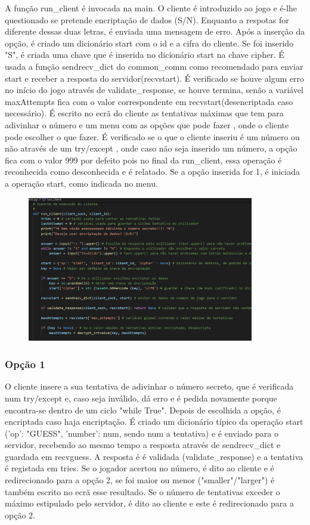 \documentclass{report}
\begin{document}
\label{ssec:runclient}
A função run\_client é invocada na main. O cliente é introduzido ao jogo e é-lhe questionado se pretende encriptação
de dados (S/N). Enquanto a respotas for diferente dessas duas letras, é enviada uma mensagem de erro. Após a inserção da
opção, é criado um dicionário start com o id e a cifra do cliente. Se foi inserido "S", é criada uma chave que é inserida
no dicionário start na chave cipher. É usada a função sendrecv\_dict do common\_comm como recomendado para enviar start
e receber a resposta do servidor(recvstart). É verificado se houve algum erro no início do jogo através de validate\_response,
se houve termina, senão a variável maxAttempts fica com o valor correspondente em recvstart(desencriptada caso necessário). É escrito no ecrã do cliente as tentativas máximas que tem para adivinhar o número e um menu com as opções que pode fazer
, onde o cliente pode escolher o que fazer. É verificado se o que o cliente inseriu é um número ou não através de um try/except
, onde caso não seja inserido um número, a opção fica com o valor 999 por defeito pois no final da run\_client, essa operação é
 reconhecida como desconhecida e é relatado. Se a opção inserida for 1, é iniciada a operação start, como indicada no menu. 
 
 \begin{figure}[!h]
\center
\includegraphics[height = 180pt]{img/run1.png}
\end{figure}

\subsubsection{Opção 1}
\label{sssec:first}

O cliente insere a sua tentativa de adivinhar o número secreto, que é verificada num try/except e, caso seja inválido, dá
erro e é pedida novamente porque encontra-se dentro de um ciclo "while True". Depois de escolhida a opção, é encriptada
caso haja encriptação. É criado um dicionário típico da operação start ({'op': "GUESS", 'number': num}, sendo num a tentativa)
e é enviado para o servidor, recebendo ao mesmo tempo a resposta através de sendrecv\_dict e guardada em recvguess. A resposta é
é validada (validate\_response) e a tentativa é registada em tries. Se o jogador acertou no número, é dito ao cliente e é redirecionado
para a opção 2, se foi maior ou menor ("smaller"/"larger") é também escrito no ecrã esse resultado. Se o número de tentativas
exceder o máximo estipulado pelo servidor, é dito ao cliente e este é redirecionado para a opção 2.
\end{document}
